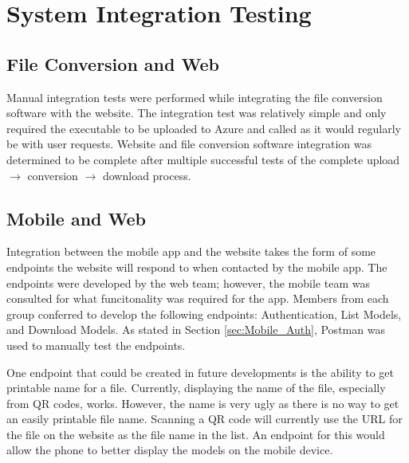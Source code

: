 
\section{System Integration Testing}

	\subsection{File Conversion and Web}
		
		Manual integration tests were performed while integrating the file conversion software with the website. The integration test was relatively simple and only required the executable to be uploaded to Azure and called as it would regularly be with user requests. Website and file conversion software integration was determined to be complete after multiple successful tests of the complete upload $\rightarrow$ conversion $\rightarrow$ download process.

	\subsection{Mobile and Web}

		Integration between the mobile app and the website takes the form of some endpoints the website will respond to when contacted by the mobile app. The endpoints were developed by the web team; however, the mobile team was consulted for what funcitonality was required for the app.  Members from each group conferred to develop the following endpoints: Authentication, List Models, and Download Models.  As stated in Section \ref{sec:Mobile_Auth}, Postman was used to manually test the endpoints.

		One endpoint that could be created in future developments is the ability to get printable name for a file.  Currently, displaying the name of the file, especially from QR codes, works.  However, the name is very ugly as there is no way to get an easily printable file name.  Scanning a QR code will currently use the URL for the file on the website as the file name in the list.  An endpoint for this would allow the phone to better display the models on the mobile device.